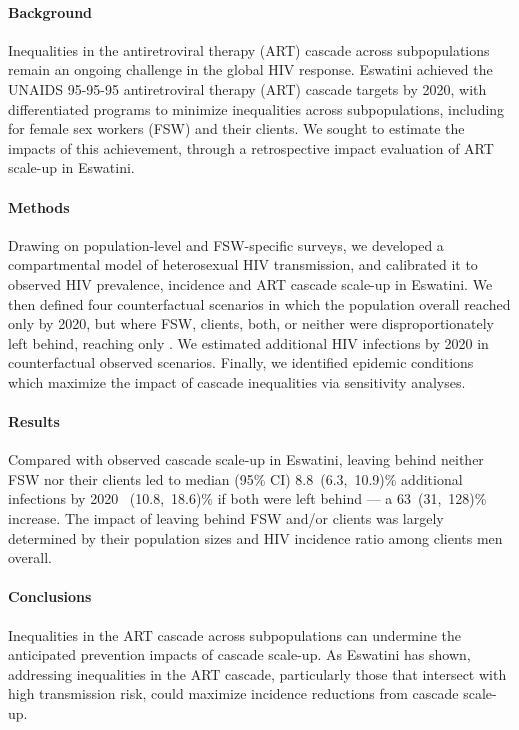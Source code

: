 \paragraph{Background}
Inequalities in the antiretroviral therapy (ART) cascade across subpopulations
remain an ongoing challenge in the global HIV response.
Eswatini achieved the UNAIDS 95-95-95 antiretroviral therapy (ART) cascade targets by 2020,
with differentiated programs to minimize inequalities across subpopulations,
including for female sex workers (FSW) and their clients.
We sought to estimate the impacts of this achievement,
through a retrospective impact evaluation of ART scale-up in Eswatini.
\paragraph{Methods}
Drawing on population-level and FSW-specific surveys,
we developed a compartmental model of heterosexual HIV transmission,
and calibrated it to observed HIV prevalence, incidence and ART cascade scale-up in Eswatini.
We then defined four counterfactual scenarios in which
the population overall reached only \casmd by 2020,
but where FSW, clients, both, or neither
were disproportionately left behind, reaching only \caslo.
We estimated additional HIV infections by 2020
in counterfactual \vs observed scenarios.
Finally, we identified epidemic conditions which
maximize the impact of cascade inequalities via sensitivity analyses.
\paragraph{Results}
Compared with observed cascade scale-up in Eswatini,
leaving behind neither FSW nor their clients led to median (95\% CI)
8.8~(6.3,~10.9)\% additional infections by 2020 ~(10.8,~18.6)\% if both were left behind %
--- a 63~(31,~128)\% increase. %
The impact of leaving behind FSW and/or clients was largely determined by
their population sizes and HIV incidence ratio among clients \vs men overall.
\paragraph{Conclusions}
Inequalities in the ART cascade across subpopulations
can undermine the anticipated prevention impacts of cascade scale-up.
As Eswatini has shown,
addressing inequalities in the ART cascade,
particularly those that intersect with high transmission risk,
could maximize incidence reductions from cascade scale-up.
